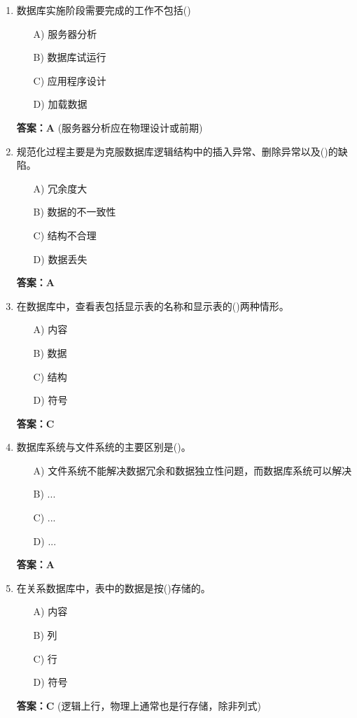 \documentclass[a4paper,12pt]{article}
\begin{document}
\begin{enumerate}[label=\arabic*.]
\item 数据库实施阶段需要完成的工作不包括()
\begin{itemize}
    \item[A)] 服务器分析
    \item[B)] 数据库试运行
    \item[C)] 应用程序设计
    \item[D)] 加载数据
\end{itemize}
\textbf{答案：A} (服务器分析应在物理设计或前期)

\item 规范化过程主要是为克服数据库逻辑结构中的插入异常、删除异常以及()的缺陷。
\begin{itemize}
    \item[A)] 冗余度大
    \item[B)] 数据的不一致性
    \item[C)] 结构不合理
    \item[D)] 数据丢失
\end{itemize}
\textbf{答案：A}

\item 在数据库中，查看表包括显示表的名称和显示表的()两种情形。
\begin{itemize}
    \item[A)] 内容
    \item[B)] 数据
    \item[C)] 结构
    \item[D)] 符号
\end{itemize}
\textbf{答案：C}

\item 数据库系统与文件系统的主要区别是()。
\begin{itemize}
    \item[A)] 文件系统不能解决数据冗余和数据独立性问题，而数据库系统可以解决
    \item[B)] ...
    \item[C)] ...
    \item[D)] ...
\end{itemize}
\textbf{答案：A}

\item 在关系数据库中，表中的数据是按()存储的。
\begin{itemize}
    \item[A)] 内容
    \item[B)] 列
    \item[C)] 行
    \item[D)] 符号
\end{itemize}
\textbf{答案：C} (逻辑上行，物理上通常也是行存储，除非列式)


\end{enumerate}
\end{document}
